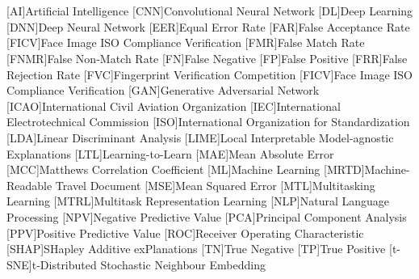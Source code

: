 \section*{} 

\begin{acronym}[FNMR]
[AI]{Artificial Intelligence}
[CNN]{Convolutional Neural Network}
[DL]{Deep Learning}
[DNN]{Deep Neural Network}
[EER]{Equal Error Rate}
[FAR]{False Acceptance Rate}
[FICV]{Face Image ISO Compliance Verification}
[FMR]{False Match Rate}
[FNMR]{False Non-Match Rate}
[FN]{False Negative}
[FP]{False Positive}
[FRR]{False Rejection Rate}
[FVC]{Fingerprint Verification Competition}
[FICV]{Face Image ISO Compliance Verification}
[GAN]{Generative Adversarial Network}
[ICAO]{International Civil Aviation Organization}
[IEC]{International Electrotechnical Commission}
[ISO]{International Organization for Standardization}
[LDA]{Linear Discriminant Analysis}
[LIME]{Local Interpretable Model-agnostic Explanations}
[LTL]{Learning-to-Learn}
[MAE]{Mean Absolute Error}
[MCC]{Matthews Correlation Coefficient}
[ML]{Machine Learning}
[MRTD]{Machine-Readable Travel Document}
[MSE]{Mean Squared Error}
[MTL]{Multitasking Learning}
[MTRL]{Multitask Representation Learning}
[NLP]{Natural Language Processing}
[NPV]{Negative Predictive Value}
[PCA]{Principal Component Analysis}
[PPV]{Positive Predictive Value}
[ROC]{Receiver Operating Characteristic}
[SHAP]{SHapley Additive exPlanations}
[TN]{True Negative}
[TP]{True Positive}
[t-SNE]{t-Distributed Stochastic Neighbour Embedding}
\end{acronym}


